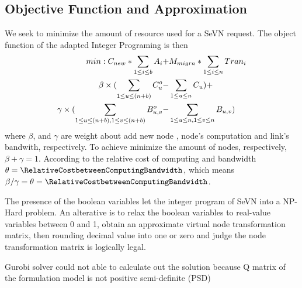 \subsection{Objective Function and Approximation}
We seek to minimize the amount of resource used for a SeVN request. The object function of the adapted Integer Programing is then
\begin{align*}
min: C_{new}*\sum_{1\leq i\leq b}A_i+ & M_{migra}*\sum_{1\leq i\leq n}Tran_i  \notag \\
\beta \times(\sum_{1\leq u\leq (n+b)}C^o_{u}- & \sum_{1\leq u\leq n}C_{u}) + \notag \\
\gamma \times(\sum_{1\leq u\leq (n+b),1\leq v\leq (n+b)}B^o_{u,v}- & \sum_{1\leq u\leq n,1\leq v\leq n}B_{u,v})
\end{align*}
where $\beta$, and $\gamma$ are weight about add new node , node's computation and link's bandwith, respectively. To achieve minimize the amount of nodes, respectively, $\beta+\gamma=1$. According to\cite{armbrust2009above,yu2010survivable} the relative cost of computing and bandwidth $\theta=\RelativeCostbetweenComputingBandwidth$, which means $\beta/\gamma=\theta=\RelativeCostbetweenComputingBandwidth$.

The presence of the boolean variables let the integer program of SeVN into a NP-Hard problem. An alterative is to relax the boolean variables to real-value variables between 0 and 1, obtain an approximate virtual node transformation matrix, then rounding decimal value into one or zero and judge the node transformation matrix is logically legal.


Gurobi solver could not able to calculate out the solution because Q matrix of the formulation model is not positive semi-definite (PSD)
